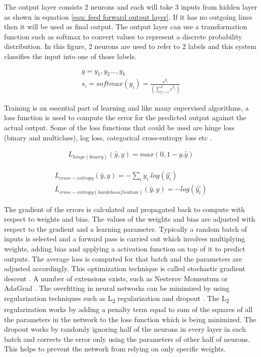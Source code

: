 \documentclass[a4paper, 11pt]{article}
\begin{document}
The output layer consists 2 neurons and each will take 3 inputs from hidden layer as shown in equation \ref{equ: feed forward output layer}. If it has no outgoing lines then it will be used as final output. The output layer can use a transformation function such as softmax to convert values to represent a discrete probability distribution. In this figure, 2 neurons are used to refer to 2 labels and this system classifies the input into one of those labels. 

\begin{align*}
y = y_1,y_2...,y_k \\
s_i = softmax(y_i) = \frac{e^{y_i}}{(\sum_{j=1}^ke^{y_j})}
\end{align*}

Training is an essential part of learning and like many supervised algorithms, a loss function is used to compute the error for the predicted output against the actual output. Some of the loss functions that could be used are hinge loss (binary and multiclass), log loss, categorical cross-entropy loss etc \cite{Goldberg2016}. 

\begin{align*}
L_{hinge(binary)}(\hat{y},y) = max(0,1-y.\hat{y})
\end{align*}

\begin{align*}
L_{cross-entropy}(\hat{y},y) = -\sum_iy_i.log(\hat{y_i}) \\
L_{cross-entropy(hard classification)}(\hat{y},y) = -log(\hat{y_t})
\end{align*}

The gradient of the errors is calculated and propagated back to compute with respect to weights and bias. The values of the weights and bias are adjusted with respect to the gradient and a learning parameter. Typically a random batch of inputs is selected and a forward pass is carried out which involves multiplying weights, adding bias and applying a activation function on top of it to predict outputs. The average loss is computed for that batch and the parameters are adjusted accordingly. This optimization technique is called stochastic gradient descent \cite{Bottou2012}. A number of extensions exists, such as Nesterov Momentum \cite{Sutskever2013} or AdaGrad \cite{Duchi2011}. The overfitting in neural networks can be minimized by using regularization techniques such as L\textsubscript{2} regularization and dropout \cite{Hinton2012}. The L\textsubscript{2} regularization works by adding a penalty term equal to sum of the squares of all the parameters in the network to the loss function which is being minimized. The dropout works by randomly ignoring half of the neurons in every layer in each batch and corrects the error only using the parameters of other half of neurons. This helps to prevent the network from relying on only specific weights. 
\end{document}
